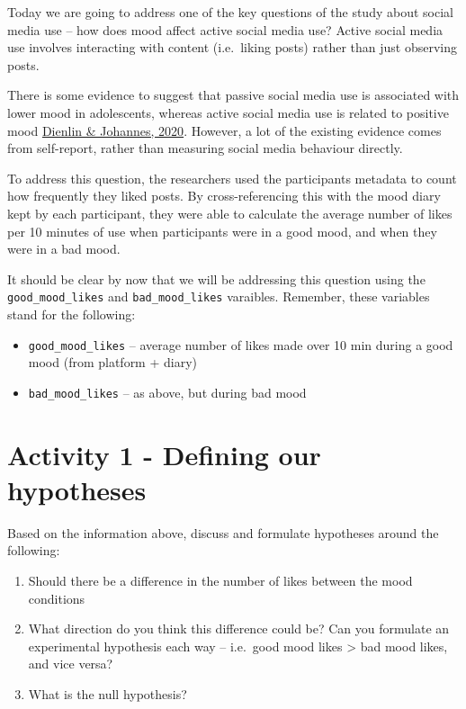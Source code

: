 \documentclass[
]{book}
\providecommand{\tightlist}{%
  \setlength{\itemsep}{0pt}\setlength{\parskip}{0pt}}
\begin{document}
Today we are going to address one of the key questions of the study about social media use -- how does mood affect active social media use? Active social media use involves interacting with content (i.e.~liking posts) rather than just observing posts.

There is some evidence to suggest that passive social media use is associated with lower mood in adolescents, whereas active social media use is related to positive mood \href{https://pmc.ncbi.nlm.nih.gov/articles/PMC7366938/}{Dienlin \& Johannes, 2020}. However, a lot of the existing evidence comes from self-report, rather than measuring social media behaviour directly.

To address this question, the researchers used the participants metadata to count how frequently they liked posts. By cross-referencing this with the mood diary kept by each participant, they were able to calculate the average number of likes per 10 minutes of use when participants were in a good mood, and when they were in a bad mood.

It should be clear by now that we will be addressing this question using the \texttt{good\_mood\_likes} and \texttt{bad\_mood\_likes} varaibles. Remember, these variables stand for the following:

\begin{itemize}
\tightlist
\item
  \texttt{good\_mood\_likes} -- average number of likes made over 10 min during a good mood (from platform + diary)
\item
  \texttt{bad\_mood\_likes} -- as above, but during bad mood
\end{itemize}

\section{Activity 1 - Defining our hypotheses}\label{activity-1---defining-our-hypotheses}

Based on the information above, discuss and formulate hypotheses around the following:

\begin{enumerate}
\def\labelenumi{\arabic{enumi}.}
\tightlist
\item
  Should there be a difference in the number of likes between the mood conditions
\item
  What direction do you think this difference could be? Can you formulate an experimental hypothesis each way -- i.e.~good mood likes \textgreater{} bad mood likes, and vice versa?
\item
  What is the null hypothesis?
\end{enumerate}
\end{document}
